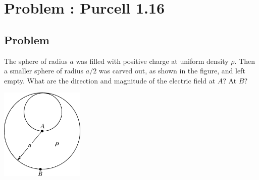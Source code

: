\documentclass[solutions]{esg8022pset}
\begin{document}
\section{Problem \thesection: Purcell 1.16}
\subsection{Problem}
  The sphere of radius $a$ was filled with positive charge at uniform density $\rho$. Then a smaller sphere of radius $a/2$ was carved out, as shown in the figure, and left empty. What are the direction and magnitude of the electric field at $A$? At $B$?
  \begin{center}\includegraphics[width=0.3\textwidth]{ps02_1}\end{center}
\end{document}
